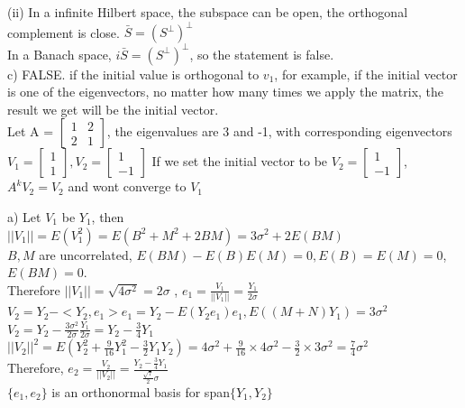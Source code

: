 \documentclass[11pt]{article}
\newenvironment{problem}[2][Problem]{\begin{trivlist}
\item[\hskip \labelsep {\bfseries #1}\hskip \labelsep {\bfseries #2.}]}{\end{trivlist}}
\begin{document}
(ii) In a infinite Hilbert space, the subspace can be open, the orthogonal complement is close. $\bar{S} = (S^{\perp})^{\perp}$ \\
In a Banach space, $i\bar{S} = (S^{\perp})^{\perp}$, so the statement is false.\\

c) FALSE. if the initial value is orthogonal to $v_1$, for example, if the initial vector is one of the eigenvectors, no matter how many times we apply the matrix, the result we get will be the initial vector.\\
Let A = $\begin{bmatrix}
1& 2\\2 &1
\end{bmatrix}$, the eigenvalues are 3 and -1, with corresponding eigenvectors  $V_1 = \begin{bmatrix}
1\\1
\end{bmatrix},V_2 = \begin{bmatrix}
1\\-1
\end{bmatrix}$  If we set the initial vector to be $V_2 = \begin{bmatrix}
1\\-1
\end{bmatrix}$, $A^{k}V_2 = V_2$ and wont converge to $V_1$\\

\begin{problem}{2}
\end{problem}
a) Let $V_1$ be $Y_1$, then $||V_1|| = E(V_1^2) = E(B^2 +M^2 +2BM)=3\sigma^2 + 2E(BM)$\\ $B, M$ are uncorrelated, $E(BM)-E(B)E(M) = 0, E(B) =E(M) = 0$,$E(BM) = 0$.\\ Therefore $||V_1|| = \sqrt{4\sigma^2} = 2\sigma$ , $e_1 = \frac{V_1}{||V_1||}= \frac{Y_1}{2\sigma}$\\

$V_2 = Y_2 - <Y_2,e_1>e_1 = Y_2 - E(Y_2e_1)e_1,  E((M+N)Y_1) = 3\sigma^2$ \\
$V_2 = Y_2 - \frac{3\sigma^2}{2\sigma}\frac{Y_1}{2\sigma} = Y_2 - \frac{3}{4}Y_1$\\
$||V_2||^2= E(Y_2^2 + \frac{9}{16} Y_1^2-\frac{3}{2}Y_1Y_2) = 4\sigma^2 + \frac{9}{16}\times 4\sigma^2 - \frac{3}{2}\times 3 \sigma^2 = \frac{7}{4}\sigma^2$\\
Therefore, $e_2 = \frac{V_2}{||V_2||} = \frac{Y_2 - \frac{3}{4}Y_1}{\frac{\sqrt{7}}{2}\sigma}$\\
$\{e_1,e_2\}$ is an orthonormal basis for span$\{Y_1,Y_2\}$ \\
\end{document}
